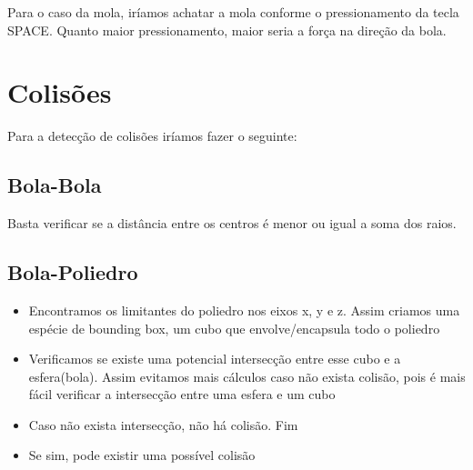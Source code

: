 \documentclass[a4paper,12pt]{article}
\begin{document}
Para o caso da mola, iríamos achatar a mola conforme o pressionamento da tecla SPACE. Quanto maior pressionamento, maior seria a força na direção da bola. 

\section{Colisões}
\mbox{}

Para a detecção de colisões iríamos fazer o seguinte:

\subsection{Bola-Bola}
\mbox{}

Basta verificar se a distância entre os centros é menor ou igual a soma dos raios.

\subsection{Bola-Poliedro}
\mbox{}

\begin{itemize}
\item Encontramos os limitantes do poliedro nos eixos x, y e z. Assim criamos uma espécie de bounding box, um cubo que envolve/encapsula todo o poliedro
\item Verificamos se existe uma potencial intersecção entre esse cubo e a esfera(bola). Assim evitamos mais cálculos caso não exista colisão, pois é mais
  fácil verificar a intersecção entre uma esfera e um cubo
\item Caso não exista intersecção, não há colisão. Fim
\item Se sim, pode existir uma possível colisão
  
\end{itemize}
\end{document}
